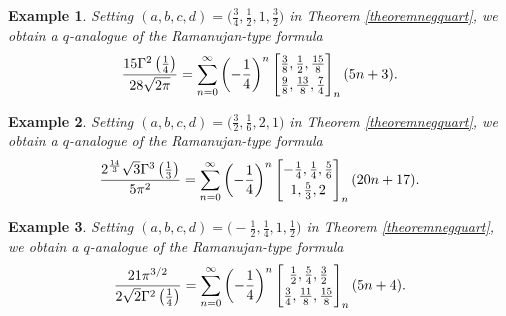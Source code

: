 \documentclass[12pt]{article}
\newtheorem{example}{Example}
\begin{document}
\begin{example}
 Setting $(a, b, c, d) = \big( \frac{3}{4}, \frac{1}{2}, 1, \frac{3}{2} \big)$ in Theorem \ref{theoremnegquart}, we obtain 
 a $q$-analogue of the Ramanujan-type formula 
\begin{equation*}
 \frac{15 \Gamma^{2}\left( \frac{1}{4} \right) }{28 \sqrt{2\pi}} = 
 \sum_{n = 0}^{\infty} 
 \left( -\frac{1}{4} \right)^{n} \left[ \begin{matrix} 
 \frac{3}{8}, \frac{1}{2}, \frac{15}{8} 
 \vspace{1mm} \\ 
 \frac{9}{8}, \frac{13}{8}, \frac{7}{4} 
 \end{matrix} \right]_{n} (5 n + 3). 
 \end{equation*}
\end{example}

 \begin{example}
 Setting $(a, b, c, d) = \big( \frac{3}{2}, \frac{1}{6}, 2, 1 \big)$ in Theorem \ref{theoremnegquart}, we obtain 
 a $q$-analogue of the Ramanujan-type formula 
\begin{equation*}
 \frac{ 2^{\frac{14}{3}} \sqrt{3} \Gamma^{3}\left( \frac{1}{3} \right) }{5 \pi^2} = 
 \sum_{n = 0}^{\infty} 
 \left( -\frac{1}{4} \right)^{n} \left[ \begin{matrix} 
 -\frac{1}{4}, \frac{1}{4}, \frac{5}{6} 
 \vspace{1mm} \\ 
 1, \frac{5}{3}, 2 
 \end{matrix} \right]_{n} (20 n + 17). 
 \end{equation*}
\end{example}

\begin{example}
 Setting $(a, b, c, d) = \big( -\frac{1}{2}, \frac{1}{4}, 1, \frac{1}{2} \big)$ in Theorem \ref{theoremnegquart}, we obtain 
 a $q$-analogue of the Ramanujan-type formula 
\begin{equation*}
 \frac{21 \pi^{3/2} }{2 \sqrt{2} \Gamma^{2}\left( \frac{1}{4} \right)} = 
 \sum_{n = 0}^{\infty} 
 \left( -\frac{1}{4} \right)^{n} \left[ \begin{matrix} 
 \frac{1}{2}, \frac{5}{4}, \frac{3}{2} 
 \vspace{1mm} \\ 
 \frac{3}{4}, \frac{11}{8}, \frac{15}{8} 
 \end{matrix} \right]_{n} (5 n + 4). 
 \end{equation*}
\end{example}
\end{document}
